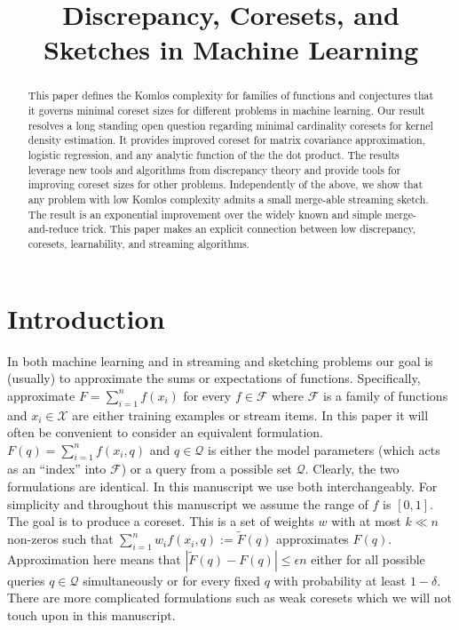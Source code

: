\documentclass[anon,12pt]{colt2019} %
\title[Discrepancy, Coresets, and Sketches in Machine Learning]{Discrepancy, Coresets, and Sketches in Machine Learning}
\newcommand{\eps}{\epsilon}
\newcommand{\F}{\mathcal{F}}
\newcommand{\Q}{\mathcal{Q}}
\begin{document}
\maketitle

\begin{abstract}
This paper defines the Komlos complexity for families of functions and conjectures that it governs minimal coreset sizes for different problems in machine learning. Our result resolves a long standing open question regarding minimal cardinality coresets for kernel density estimation. It provides improved coreset for matrix covariance approximation, logistic regression, and any analytic function of the the dot product. The results leverage new tools and algorithms from discrepancy theory and provide tools for improving coreset sizes for other problems. Independently of the above, we show that any problem with low Komlos complexity admits a small merge-able streaming sketch. 
The result is an exponential improvement over the widely known and simple merge-and-reduce trick.
This paper makes an explicit connection between low discrepancy, coresets, learnability, and streaming algorithms. 
\end{abstract}


\section{Introduction}
In both machine learning and in streaming and sketching problems our goal is (usually) to approximate the sums or expectations of functions.
Specifically, approximate $F = \sum_{i=1}^{n} f(x_i)$ for every $f\in \F$ where $\F$ is a family of functions and $x_i \in \mathcal X$ are either training examples or stream items.
In this paper it will often be convenient to consider an equivalent formulation.
$F(q) = \sum_{i=1}^{n} f(x_i, q)$  and $q \in \mathcal Q$ is either the model parameters (which acts as an ``index'' into $\F$) or a query from a possible set $\Q$. 
Clearly, the two formulations are identical. In this manuscript we use both interchangeably.  
For simplicity and throughout this manuscript we assume the range of $f$ is $[0,1]$.
The goal is to produce a coreset. This is a set of weights $w$ with at most $k \ll n$ non-zeros such that $\sum_{i=1}^{n}w_i f(x_i,q) := \tilde F(q)$ approximates $F(q)$.
Approximation here means that $|\tilde F(q)  - F(q)| \le \eps n$ either for all possible queries $q \in \mathcal Q$ simultaneously or for every fixed $q$ with probability at least $1-\delta$. 
There are more complicated formulations such as weak coresets which we will not touch upon in this manuscript.
\end{document}
